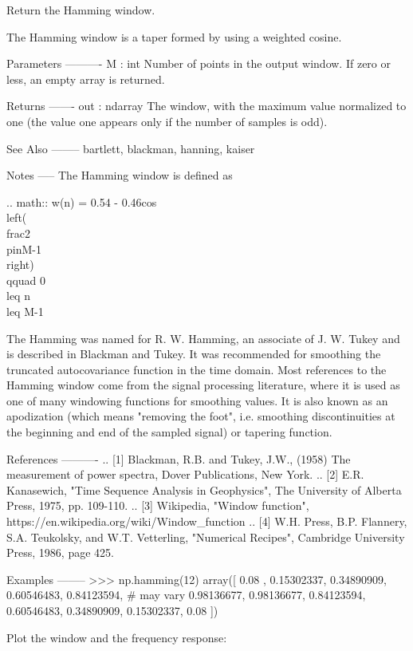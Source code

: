 \begin{DoxyVerb}Return the Hamming window.

The Hamming window is a taper formed by using a weighted cosine.

Parameters
----------
M : int
    Number of points in the output window. If zero or less, an
    empty array is returned.

Returns
-------
out : ndarray
    The window, with the maximum value normalized to one (the value
    one appears only if the number of samples is odd).

See Also
--------
bartlett, blackman, hanning, kaiser

Notes
-----
The Hamming window is defined as

.. math::  w(n) = 0.54 - 0.46cos\\left(\\frac{2\\pi{n}}{M-1}\\right)
           \\qquad 0 \\leq n \\leq M-1

The Hamming was named for R. W. Hamming, an associate of J. W. Tukey
and is described in Blackman and Tukey. It was recommended for
smoothing the truncated autocovariance function in the time domain.
Most references to the Hamming window come from the signal processing
literature, where it is used as one of many windowing functions for
smoothing values.  It is also known as an apodization (which means
"removing the foot", i.e. smoothing discontinuities at the beginning
and end of the sampled signal) or tapering function.

References
----------
.. [1] Blackman, R.B. and Tukey, J.W., (1958) The measurement of power
       spectra, Dover Publications, New York.
.. [2] E.R. Kanasewich, "Time Sequence Analysis in Geophysics", The
       University of Alberta Press, 1975, pp. 109-110.
.. [3] Wikipedia, "Window function",
       https://en.wikipedia.org/wiki/Window_function
.. [4] W.H. Press,  B.P. Flannery, S.A. Teukolsky, and W.T. Vetterling,
       "Numerical Recipes", Cambridge University Press, 1986, page 425.

Examples
--------
>>> np.hamming(12)
array([ 0.08      ,  0.15302337,  0.34890909,  0.60546483,  0.84123594, # may vary
        0.98136677,  0.98136677,  0.84123594,  0.60546483,  0.34890909,
        0.15302337,  0.08      ])

Plot the window and the frequency response:


\end{DoxyVerb}
